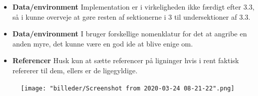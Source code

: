 \documentclass[11pt, fleqn, titlepage]{article}
\begin{document}
\begin{itemize}
		\item \textbf{Data/environment} Implementation er i virkeligheden ikke færdigt efter 3.3, så i kunne overveje at gøre resten af sektionerne i 3 til undersektioner af 3.3.
		
		\item \textbf{Data/environment} I bruger forskellige nomenklatur for det at angribe en anden myre, det kunne være en god ide at blive enige om.
		
		\item \textbf{Referencer} Husk kun at sætte referencer på ligninger hvis i rent faktisk refererer til dem, ellers er de ligegyldige.
		
	\end{itemize}
	
	\begin{figure}[H]
		\centering
		\texttt{[image: "billeder/Screenshot from 2020-03-24 08-21-22".png]}
	\end{figure}
	
	
	
	
	
\end{document}

